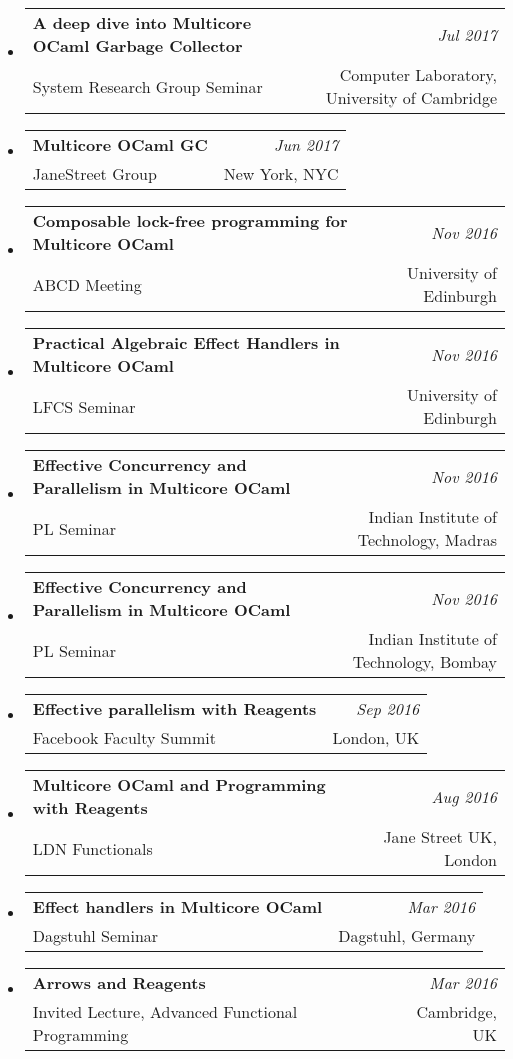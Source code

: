 \documentclass[10pt]{article}
\makeatletter
\newcommand{\lbar}[1]{{\color{#1}\ding{118}}\hspace*{2pt}}
\newenvironment{talk}[4]
{ \item
  \begin{tabular*}{7.5in}{l@{\extracolsep{\fill}}r}
    \textbf{#1} & \textit{#2} \\
    \hspace{1ex} #3 & \small{#4}
\end{tabular*}
} {}
\newenvironment{itemregion}[1]{
  \vspace*{0.5ex}
  {\scalebox{1.4}{\textbf{#1}}}
  \begin{itemize}\itemsep1pt}
  {\end{itemize}\vspace{0.8ex}}
\makeatother
\begin{document}
\begin{itemregion}{\lbar{blue}Talks}

  \begin{talk} {A deep dive into Multicore OCaml Garbage Collector}
    {Jul 2017}  {System Research Group Seminar} {Computer Laboratory, University of Cambridge}
  \end{talk}

  \begin{talk} {Multicore OCaml GC}
    {Jun 2017} {JaneStreet Group} {New York, NYC}
  \end{talk}

  \begin{talk} {Composable lock-free programming for Multicore OCaml}
    {Nov 2016} {ABCD Meeting} {University of Edinburgh}
  \end{talk}

  \begin{talk} {Practical Algebraic Effect Handlers in Multicore OCaml}
    {Nov 2016} {LFCS Seminar} {University of Edinburgh}
  \end{talk}

  \begin{talk} {Effective Concurrency and Parallelism in Multicore OCaml}
    {Nov 2016} {PL Seminar} {Indian Institute of Technology, Madras}
  \end{talk}

  \begin{talk} {Effective Concurrency and Parallelism in Multicore OCaml}
    {Nov 2016} {PL Seminar} {Indian Institute of Technology, Bombay}
  \end{talk}

  \begin{talk} {Effective parallelism with Reagents}
    {Sep 2016} {Facebook Faculty Summit} {London, UK}
  \end{talk}
  \begin{talk} {Multicore OCaml and Programming with Reagents}
    {Aug 2016} {LDN Functionals} {Jane Street UK, London}
  \end{talk}

  \begin{talk} {Effect handlers in Multicore OCaml}
    {Mar 2016} {Dagstuhl Seminar} {Dagstuhl, Germany}
  \end{talk}

  \begin{talk} {Arrows and Reagents}
    {Mar 2016} {Invited Lecture, Advanced Functional Programming} {Cambridge, UK}
  \end{talk}


\end{itemregion}
\end{document}
